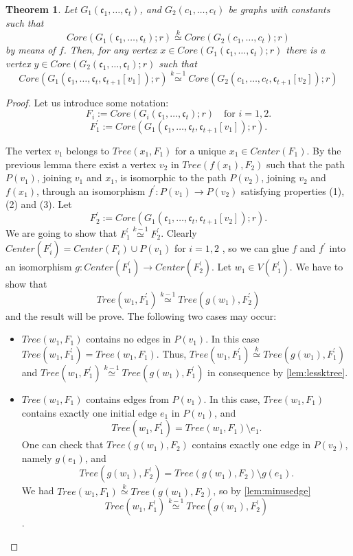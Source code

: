\documentclass[11pt,notitlepage]{report}
\newtheorem{theorem}{Theorem}[chapter]
\theoremstyle{definition}
\newcommand{\cc}{\mathfrak{c}}
\newcommand{\morph}[1]{\stackrel{#1}{\simeq}}
\begin{document}
\begin{theorem} \label{thm:chooseconstant}
	Let $G_1(\cc_1,\dots, \cc_t)$, and $G_2(c_1,\dots,c_t)$ be graphs
	with constants such that 
	\[ Core(G_1(\cc_1,\dots, \cc_t);r)\morph{k} Core(G_2(c_1,\dots,c_t);r)\]
	by means of $f$. 
	Then, for any vertex $x\in Core(G_1(\cc_1,\dots, \cc_t);r)$ there is a vertex
	$y\in Core(G_2(\cc_1,\dots, \cc_t);r)$ such that 
	\[Core(G_1(\cc_1,\dots, \cc_t,\cc_{t+1}[v_1]);r)\morph{k-1} Core(G_2(c_1,\dots,c_t,\cc_{t+1}[v_2]);r)\]
\end{theorem}
\begin{proof}
	Let us introduce some notation:
	\[F_i:=Core(G_i(\cc_1,\dots, \cc_t);r)\quad \text{for }i=1,2. \]
	\[F^\prime_1:=Core(G_1(\cc_1,\dots, \cc_t,\cc_{t+1}[v_1]);r).\]
	
	The vertex $v_1$ belongs to $Tree(x_1,F_1)$
	for a unique $x_1\in Center(F_1)$. By the previous lemma there exist a vertex $v_2$ in 
	$Tree(f(x_1),F_2)$ such that the path $P(v_1)$, 
	joining $v_1$ and $x_1$, is isomorphic to the path
	$P(v_2)$, joining $v_2$ and $f(x_1)$, through an isomorphism $f^\prime: P(v_1)
	\rightarrow P(v_2)$ satisfying properties (1), (2) and (3). 
	Let 
	\[F^\prime_2:=Core(G_1(\cc_1,\dots, \cc_t,\cc_{t+1}[v_2]);r).\]
	We are going to show that $F^\prime_1\morph{k-1}F^\prime_2$.
	Clearly $Center(F^\prime_i)=Center(F_i)\cup P(v_1)$ for $i=1,2$ , so we can glue
	$f$ and $f^\prime$ into an isomorphism $g:Center(F^\prime_1)\rightarrow Center(F^\prime_2)$.
	Let $w_1\in V(F^\prime_1)$. We have to show that 
	\[Tree(w_1, F^\prime_1)\morph{k-1} Tree(g(w_1), F^\prime_2)\]
	and the result will be prove. The following two cases may occur:
	\begin{itemize}[leftmargin=*]
		\item $Tree(w_1,F_1)$ contains no edges in $P(v_1)$. 
		In this case $Tree(w_1,F^\prime_1)=Tree(w_1,F_1)$.
		Thus, $Tree(w_1,F^\prime_1)\morph{k} Tree(g(w_1),F^\prime_1)$
		and $Tree(w_1,F^\prime_1)\morph{k-1} Tree(g(w_1),F^\prime_1)$
		in consequence by \cref{lem:lessktree}.
		\item $Tree(w_1,F_1)$ contains edges from $P(v_1)$.
		In this case, $Tree(w_1,F_1)$ contains exactly one initial edge
		$e_1$ in $P(v_1)$, and 
		\[Tree(w_1,F^\prime_1)=Tree(w_1,F_1)\setminus e_1. \]
		One can check that $Tree(g(w_1),F_2)$ contains exactly one edge
		in $P(v_2)$, namely $g(e_1)$, and 
		\[Tree(g(w_1),F^\prime_2)=Tree(g(w_1),F_2)\setminus g(e_1).\]
		We had $Tree(w_1,F_1)\morph{k}Tree(g(w_1),F_2)$, so by
		\cref{lem:minusedge}
		\[Tree(w_1,F^\prime_1)\morph{k-1}Tree(g(w_1),F^\prime_2)\].	
	\end{itemize}
\end{proof}
\end{document}
